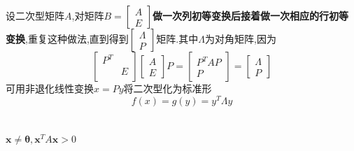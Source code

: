 \documentclass[11pt, a4paper, UTF8]{ctexart}
\begin{document}
\subsection{}
\subsection{}
\subsection{}
\subsection{}
\section{}
设二次型矩阵$A$,对矩阵$B=\begin{bmatrix}
A\\
E
\end{bmatrix}$\textbf{做一次列初等变换后接着做一次相应的行初等变换},重复这种做法,直到得到$\begin{bmatrix}
\varLambda\\
P
\end{bmatrix}$矩阵.其中$\varLambda$为对角矩阵,因为
\[\begin{bmatrix}
P^T&\\
&E\\
\end{bmatrix}\begin{bmatrix}
A\\
E
\end{bmatrix}P=\begin{bmatrix}
P^TAP\\
P
\end{bmatrix}=\begin{bmatrix}
\varLambda\\
P
\end{bmatrix}\]
可用非退化线性变换$x=Py$将二次型化为标准形
\[f(x)=g(y)=y^T\varLambda y\]
\section{}
$\bm x\not=\bm\theta,\bm x^TA\bm x>0$
\section{}
\end{document}
